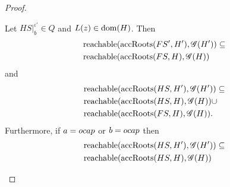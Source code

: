 \begin{proof}
\begin{description}
\begin{description}
\begin{description}
              \begin{lemma} \label{lem:2.15}
                Let $HS|_b^{\iota'} \in Q$ and $L(z) \in \mbox{$\mathrm{dom}$}(H)$. Then
                \begin{equation} \label{eq:lem2.15a}
                  \begin{aligned}
                    &\mbox{$\mathrm{reachable}$}(\mbox{$\mathrm{accRoots}$}(FS', H'), \mathscr{G}(H')) \subseteq \\
                    &\mbox{$\mathrm{reachable}$}(\mbox{$\mathrm{accRoots}$}(FS, H), \mathscr{G}(H))
                  \end{aligned}
                \end{equation}
                and
                \begin{equation}\label{eq:lem2.15b}
                  \begin{aligned}
                    &\mbox{$\mathrm{reachable}$}(\mbox{$\mathrm{accRoots}$}(HS, H'), \mathscr{G}(H')) \subseteq \\
                    &\mbox{$\mathrm{reachable}$}(\mbox{$\mathrm{accRoots}$}(HS, H), \mathscr{G}(H)) \cup  \\
                    &\mbox{$\mathrm{reachable}$}(\mbox{$\mathrm{accRoots}$}(FS, H), \mathscr{G}(H)).
                  \end{aligned}
                \end{equation}
                Furthermore, if $a = \mbox{$ocap$}$ or $b = \mbox{$ocap$}$ then
                \begin{equation}\label{eq:lem2.15c}
                  \begin{aligned}
                    &\mbox{$\mathrm{reachable}$}(\mbox{$\mathrm{accRoots}$}(HS, H'), \mathscr{G}(H')) \subseteq \\
                    &\mbox{$\mathrm{reachable}$}(\mbox{$\mathrm{accRoots}$}(HS, H), \mathscr{G}(H))
                  \end{aligned}
                \end{equation}
              \end{lemma}


\end{description}
\end{description}
\end{description}
\end{proof}

